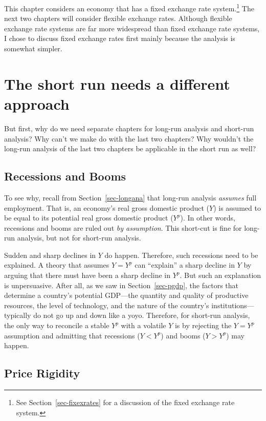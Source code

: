 \documentclass[
  letterpaper,
]{book}
\theoremstyle{plain}
\theoremstyle{remark}
\begin{document}
This chapter considers an economy that has a fixed exchange rate
system.\footnote{See Section~\ref{sec-fixexrates} for a discussion of
  the fixed exchange rate system.} The next two chapters will consider
flexible exchange rates. Although flexible exchange rate systems are far
more widespread than fixed exchange rate systems, I chose to discuss
fixed exchange rates first mainly because the analysis is somewhat
simpler.

\section{The short run needs a different
approach}\label{sec-short-run-approach}

But first, why do we need separate chapters for long-run analysis and
short-run analysis? Why can't we make do with the last two chapters? Why
wouldn't the long-run analysis of the last two chapters be applicable in
the short run as well?

\subsection{Recessions and Booms}\label{sec-recessions-booms}

To see why, recall from Section~\ref{sec-longana} that long-run analysis
\emph{assumes} full employment. That is, an economy's real gross
domestic product (\(Y\)) is assumed to be equal to its potential real
gross domestic product (\(Y^p\)). In other words, recessions and booms
are ruled out \emph{by assumption}. This short-cut is fine for long-run
analysis, but not for short-run analysis.

Sudden and sharp declines in \(Y\) do happen. Therefore, such recessions
need to be explained. A theory that assumes \(Y=Y^p\) can ``explain'' a
sharp decline in \(Y\) by arguing that there must have been a sharp
decline in \(Y^p\). But such an explanation is unpersuasive. After all,
as we saw in Section~\ref{sec-pgdp}, the factors that determine a
country's potential GDP---the quantity and quality of productive
resources, the level of technology, and the nature of the country's
institutions---typically do not go up and down like a yoyo. Therefore,
for short-run analysis, the only way to reconcile a stable \(Y^p\) with
a volatile \(Y\) is by rejecting the \(Y=Y^p\) assumption and admitting
that recessions (\(Y<Y^p\)) and booms (\(Y>Y^p\)) may happen.

\subsection{Price Rigidity}\label{sec-p-rigidity}
\end{document}
